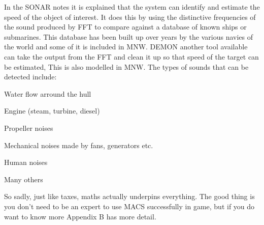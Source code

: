 In the SONAR notes it is explained that the system can identify and estimate the speed of the object of interest. It does this by using the distinctive frequencies of the sound produced by FFT to compare against a database of known ships or submarines. This database has been built up over years by the various navies of the world and some of it is included in MNW. DEMON another tool available can take the output from the FFT and clean it up so that speed of the target can be estimated, This is also modelled in MNW. The types of sounds that can be detected include:

\begin{compactitem}
    \item Water flow arround the hull
    \item Engine (steam, turbine, diesel)
    \item Propeller noises
    \item Mechanical noises made by fans, generators etc.
    \item Human noises
    \item Many others
\end{compactitem}

So sadly, just like taxes, maths actually underpins everything. The good thing is you don't need to be an expert to use MACS successfully in game, but if you do want to know more Appendix B has more detail.
\pagebreak